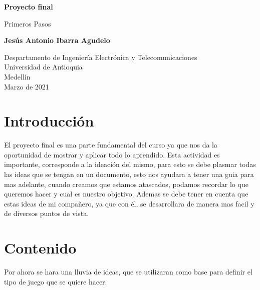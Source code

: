 \documentclass{article}
\begin{document}
\begin{titlepage}
    \begin{center}
        \vspace*{1cm}
            
        \Huge
        \textbf{Proyecto final}
            
        \vspace{0.5cm}
        \LARGE
        Primeros Pasos
            
        \vspace{1.5cm}
            
        \textbf{Jesús Antonio Ibarra Agudelo}
            
        \vfill
            
        \vspace{0.8cm}
            
        \Large
        Despartamento de Ingeniería Electrónica y Telecomunicaciones\\
        Universidad de Antioquia\\
        Medellín\\
        Marzo de 2021
            
    \end{center}
\end{titlepage}

\tableofcontents
\newpage
\section{Introducción}\label{intro}
El proyecto final es una parte fundamental del curso ya que nos da la oportunidad de mostrar y aplicar todo lo aprendido. Esta  actividad es importante, corresponde a la ideación del mismo, para esto se debe plasmar todas las ideas que se tengan en un documento, esto nos ayudara a tener una guia para mas adelante, cuando creamos que estamos atascados, podamos recordar lo que queremos hacer y cual es nuestro objetivo. Ademas se debe tener en cuenta que estas ideas de mi compañero, ya que con él, se desarrollara de manera mas facil y de diversos puntos de vista.

\newpage

\section{Contenido} \label{contenido}
Por ahora se hara una lluvia de ideas, que se utilizaran como base para definir el tipo de juego que se quiere hacer. 
\end{document}
